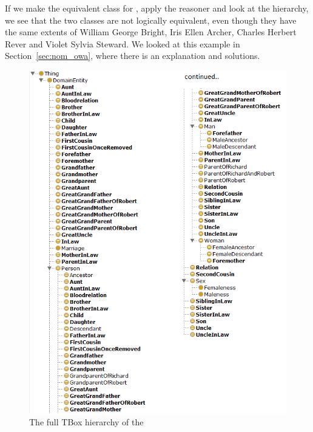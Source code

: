 
If we make the equivalent class for \rjs, apply the reasoner and look at the hierarchy, we see that the two classes are not logically equivalent, even though they have the same extents of William George Bright, Iris Ellen Archer, Charles Herbert Rever and Violet Sylvia Steward. We looked at this example in Section~\ref{sec:nom_owa}, where there is an explanation and solutions.

\begin{figure}
\begin{center}
\includegraphics[width=\largefigwidth]{figures/class_hierachy_final_1}\caption{The full TBox hierarchy of the \fhkb}
\label{fig:tbox2}
\end{center}
\end{figure}

